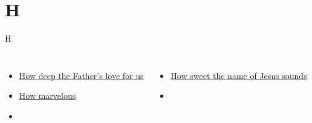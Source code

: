 \documentclass[aspectratio=169]{beamer}
\begin{document}
\section{ H }

\begin{frame}[t]{H}
\begin{columns}[t]
\begin{itemize}
    \item \hyperlink{How deep the Father's love for us[](Townend)}{How deep the Father's love for us}
    \item \hyperlink{I stand amazed['How marvelous']}{How marvelous}
    \item[] \phantom{1}
\end{itemize}
\begin{itemize}
    \item \hyperlink{How sweet the name of Jesus sounds[]}{How sweet the name of Jesus sounds}
    \item[] \phantom{1}
\end{itemize}
\end{columns}
\end{frame}
\end{document}
